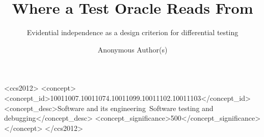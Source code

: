 \documentclass[sigconf,review,anonymous]{acmart}
\begin{document}
\title{Where a Test Oracle Reads From}
\subtitle{Evidential independence as a design criterion for differential testing}

\author{Anonymous Author(s)}

\begin{CCSXML}
<ccs2012>
   <concept>
       <concept_id>10011007.10011074.10011099.10011102.10011103</concept_id>
       <concept_desc>Software and its engineering~Software testing and debugging</concept_desc>
       <concept_significance>500</concept_significance>
       </concept>
 </ccs2012>
\end{CCSXML}


\end{document}
